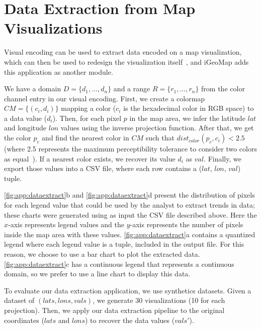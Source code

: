 \section{Data Extraction from Map Visualizations}
\label{sec:app_dataExtract}

Visual encoding can be used to extract data encoded on a map visualization, which can then be used to redesign the visualization itself~\citep{Savva2011}, and iGeoMap adds this application as another module.

We have a domain $D=\{d_1, ..., d_n\}$ and a range $R=\{r_1, ..., r_n\}$ from the color channel entry in our visual encoding. 
First, we create a colormap $CM=\{(c_i, d_i)\}$ mapping a color ($c_i$ is the hexadecimal color in RGB space) to a data value ($d_i$).  
Then, for each pixel $p$ in the map area, we infer the latitude $lat$ and longitude $lon$ values using the inverse projection function. After that, we get the color $p_c$ and find the nearest color in $CM$ such that $dist_{color}(p_c, c_i) < 2.5$ (where 2.5 represents the maximum perceptibility tolerance to consider two colors as equal~\citep{Stokes1992}). If a nearest color exists, we recover its value $d_i$ as $val$. Finally, we export those values into a \ac{CSV} file, where each row contains a ($lat$, $lon$, $val$) tuple.

\figAppDataExt

\autoref{fig:app:dataextract}b and \autoref{fig:app:dataextract}d present the distribution of pixels for each legend value that could be used by the analyst to extract trends in data; these charts were generated using as input the \ac{CSV} file described above. Here the $x$-axis represents legend values and the $y$-axis represents the number of pixels inside the map area with these values. \autoref{fig:app:dataextract}a contains a quantized legend where each legend value is a tuple, included in the output file. For this reason, we choose to use a bar chart to plot the extracted data. \autoref{fig:app:dataextract}c has a continuous legend that represents a continuous domain, so we prefer to use a line chart to display this data.

To evaluate our data extraction application, we use synthetics datasets.
Given a dataset of $(lats, lons, vals)$, we generate 30 visualizations (10 for each projection). Then, we apply our data extraction pipeline to the original coordinates (\ie $lats$ and $lons$) to recover the data values ($vals'$).

